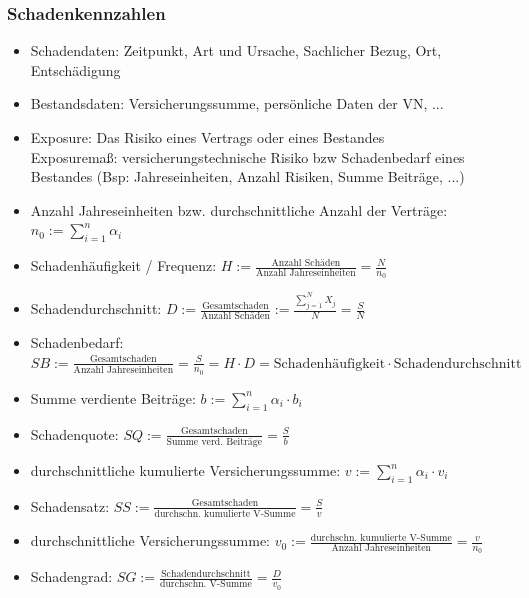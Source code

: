 \documentclass[12pt]{report}
\theoremstyle{dotless}
\theoremstyle{definition}
\begin{document}
\subsubsection{Schadenkennzahlen}
\begin{itemize}
\item Schadendaten: Zeitpunkt, Art und Ursache, Sachlicher Bezug, Ort, Entschädigung
\item Bestandsdaten: Versicherungssumme, persönliche Daten der VN, ...
\item Exposure: Das Risiko eines Vertrags oder eines Bestandes\\
Exposuremaß: versicherungstechnische Risiko bzw Schadenbedarf eines Bestandes (Bsp: Jahreseinheiten, Anzahl Risiken, Summe Beiträge, ...)
\item Anzahl Jahreseinheiten bzw. durchschnittliche Anzahl der Verträge: $n_0 := \sum_{i=1}^{n} \alpha_i$
\item Schadenhäufigkeit / Frequenz: $H:= \frac{\text{Anzahl Schäden}}{\text{Anzahl Jahreseinheiten}} = \frac{N}{n_0}$
\item Schadendurchschnitt: $D:= \frac{\text{Gesamtschaden}}{\text{Anzahl Schäden}} := \frac{\sum_{j=1}^N X_j}{N} = \frac{S}{N}$
\item Schadenbedarf: $SB:= \frac{\text{Gesamtschaden}}{\text{Anzahl Jahreseinheiten}} = \frac{S}{n_0} = H\cdot D = \text{Schadenhäufigkeit} \cdot \text{Schadendurchschnitt}$
\item Summe verdiente Beiträge: $b:= \sum_{i=1}^n \alpha_i \cdot b_i$
\item Schadenquote: $SQ:=\frac{\text{Gesamtschaden}}{\text{Summe verd. Beiträge}} = \frac{S}{b}$
\item durchschnittliche kumulierte Versicherungssumme: $v:= \sum_{i=1}^n \alpha_i \cdot v_i$
\item Schadensatz: $SS:=\frac{\text{Gesamtschaden}}{\text{durchschn. kumulierte V-Summe}} = \frac{S}{v}$
\item durchschnittliche Versicherungssumme: $v_0:= \frac{\text{durchschn. kumulierte V-Summe}}{\text{Anzahl Jahreseinheiten}} = \frac{v}{n_0}$
\item Schadengrad: $SG:=\frac{\text{Schadendurchschnitt}}{\text{durchschn. V-Summe}} = \frac{D}{v_0}$
\end{itemize}
\end{document}
